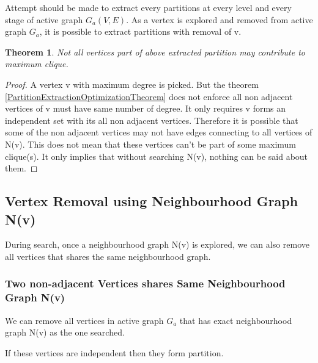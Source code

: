 \documentclass[12pt]{article}
\theoremstyle{plain}
\newtheorem{theorem}{Theorem}[section] %
\theoremstyle{definition}
\begin{document}
Attempt should be made to extract every partitions at every level and every stage of active graph $G_a(V,E)$. As a vertex is explored and removed from active graph $G_a$, it is possible to extract partitions with removal of v.


\begin{theorem}
	Not all vertices part of above extracted partition may contribute to maximum clique.
\end{theorem}

\begin{proof}
	A vertex v with maximum degree is picked. But the theorem \ref{PartitionExtractionOptimizationTheorem} does not enforce all non adjacent vertices of v must have same number of degree. It only requires v forms an independent set with its all non adjacent vertices. Therefore it is possible that some of the non adjacent vertices may not have edges connecting to all vertices of N(v). This does not mean that these vertices can't be part of some maximum clique(s). It only implies that without searching N(v), nothing can be said about them.
\end{proof}


\subsection{Vertex Removal using Neighbourhood Graph N(v)} \label{NeighbourhoodGraphOptimization}
During search, once a neighbourhood graph N(v) is explored, we can also remove all vertices that shares the same neighbourhood graph.

\subsubsection{Two non-adjacent Vertices shares Same Neighbourhood Graph N(v)}
We can remove all vertices in active graph $G_a$ that has exact neighbourhood graph N(v) as the one searched.

If these vertices are independent then they form partition.

\begin{center}
\end{center}
\end{document}
